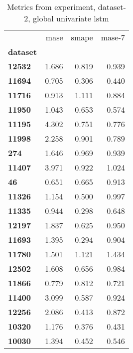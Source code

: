 \begin{table}[h]
\centering
\caption{Metrics from experiment, dataset-2, global univariate lstm}
\label{table:global-univariate-lstm-dataset-2}
\begin{tabular}{lrrr}
\toprule
{} &   mase &  smape &  mase-7 \\
\textbf{dataset} &        &        &         \\
\midrule
\textbf{12532  } &  1.686 &  0.819 &   0.939 \\
\textbf{11694  } &  0.705 &  0.306 &   0.440 \\
\textbf{11716  } &  0.913 &  1.111 &   0.884 \\
\textbf{11950  } &  1.043 &  0.653 &   0.574 \\
\textbf{11195  } &  4.302 &  0.751 &   0.776 \\
\textbf{11998  } &  2.258 &  0.901 &   0.789 \\
\textbf{274    } &  1.646 &  0.969 &   0.939 \\
\textbf{11407  } &  3.971 &  0.922 &   1.024 \\
\textbf{46     } &  0.651 &  0.665 &   0.913 \\
\textbf{11326  } &  1.154 &  0.500 &   0.997 \\
\textbf{11335  } &  0.944 &  0.298 &   0.648 \\
\textbf{12197  } &  1.837 &  0.625 &   0.950 \\
\textbf{11693  } &  1.395 &  0.294 &   0.904 \\
\textbf{11780  } &  1.501 &  1.121 &   1.434 \\
\textbf{12502  } &  1.608 &  0.656 &   0.984 \\
\textbf{11866  } &  0.779 &  0.812 &   0.721 \\
\textbf{11400  } &  3.099 &  0.587 &   0.924 \\
\textbf{12256  } &  2.086 &  0.413 &   0.872 \\
\textbf{10320  } &  1.176 &  0.376 &   0.431 \\
\textbf{10030  } &  1.394 &  0.452 &   0.546 \\
\bottomrule
\end{tabular}
\end{table}
